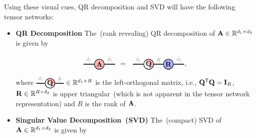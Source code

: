 Using these visual cues, QR decomposition and SVD will have the following tensor networks:
\begin{itemize}
    \item\textbf{QR Decomposition} The~(rank revealing) QR decomposition of $\mathbf{A}\in\mathbb{R}^{d_1\times d_2}$ is given by 
    
$$
\begin{tikzpicture}[baseline=\baseline]
    \tikzset{tensor/.style = {minimum size = 0.5cm,shape = circle,thick,draw=black,inner sep = 0pt}, edge/.style   = {thick,line width=.4mm},every loop/.style={}}
    \def\y{-0.2}
    \def\x{0}
    \node[tensor,fill=red!30!white] (A) at (\x,\y+0.2){$\Ab$};
    \draw[edge] (A) -- (\x-0.8,\y+0.2)  node [midway,above] {\scalebox{0.7}{\dimcolor{$d_1$}}};
    \draw[edge] (A) -- (\x+0.8,\y+0.2)  node [midway,above] {\scalebox{0.7}{\dimcolor{$d_2$}}};
    \node[draw = none] at (\x+1.2,\y+0.2){$=$};
    \node[tensor, path picture={
    \fill[fill=red!30!white](path picture bounding box.south east)
    -- 
    (path picture bounding box.north west) --
    (path picture bounding box.north east) -- cycle;
    }, shift={(\x+2.5,\y+0.2)}] (Q) {$\Qb$};
    \node[tensor,fill=blue!30!white] (R) at (\x+3.5,\y+0.2){$\Rb$};
    \draw[edge] (Q) -- (R)  node [midway,above] {\scalebox{0.7}{\dimcolor{$R$}}};
    \draw[edge] (Q) -- (\x+1.7,\y+0.2)  node [midway,above] {\scalebox{0.7}{\dimcolor{$d_1$}}};
    \draw[edge] (R) -- (\x+4.3,\y+0.2)  node [midway,above] {\scalebox{0.7}{\dimcolor{$d_2$}}};
\end{tikzpicture},$$
where 
$\begin{tikzpicture}[baseline=\baseline]
    \tikzset{tensor/.style = {minimum size = 0.5cm,shape = circle,thick,draw=black,inner sep = 0pt}, edge/.style   = {thick,line width=.4mm},every loop/.style={}}
    \def\y{0}
    \def\x{0}
    \node[tensor, path picture={
    \fill[fill=red!30!white](path picture bounding box.south east)
    -- 
    (path picture bounding box.north west) --
    (path picture bounding box.north east) -- cycle;
    }, shift={(\x,\y)}] (Q) {$\Qb$};
    \draw[edge] (Q) -- (\x+0.7,\y)  node [midway,above] {\scalebox{0.7}{\dimcolor{$R$}}};
    \draw[edge] (Q) -- (\x-0.7,\y)  node [midway,above] {\scalebox{0.7}{\dimcolor{$d_1$}}};
\end{tikzpicture}
\in\RR^{d_1\times R}$
is the left-orthogonal matrix, i.e., $\mathbf{Q}^{\mathsf{T}}\mathbf{Q} = \mathbf{I}_R$, $\mathbf{R}\in\mathbb{R}^{R\times d_2}$ is upper triangular~(which is not apparent in the tensor network representation) and $R$ is the rank of $\mathbf{A}$. 
\item \textbf{Singular Value Decomposition~(SVD)} The~(compact) SVD of $\mathbf{A}\in\mathbb{R}^{d_1\times d_2}$ is given by 

\end{itemize}
